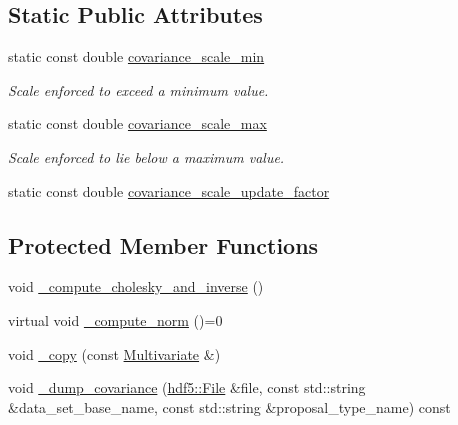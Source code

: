 \subsection*{Static Public Attributes}
\begin{DoxyCompactItemize}
\item 
static const double \hyperlink{classeos_1_1proposal__functions_1_1Multivariate_afd2de46a2288413f8e06c1f197b71ec2}{covariance\_\-scale\_\-min}
\begin{DoxyCompactList}\small\item\em Scale enforced to exceed a minimum value. \item\end{DoxyCompactList}\item 
static const double \hyperlink{classeos_1_1proposal__functions_1_1Multivariate_ab974d2da4b3dfcb7278418a25b07dd51}{covariance\_\-scale\_\-max}
\begin{DoxyCompactList}\small\item\em Scale enforced to lie below a maximum value. \item\end{DoxyCompactList}\item 
static const double \hyperlink{classeos_1_1proposal__functions_1_1Multivariate_a69c7f79624af473004a147598d9afaa1}{covariance\_\-scale\_\-update\_\-factor}
\end{DoxyCompactItemize}
\subsection*{Protected Member Functions}
\begin{DoxyCompactItemize}
\item 
void \hyperlink{classeos_1_1proposal__functions_1_1Multivariate_ad5a7764646a0c216344d96be9f01655b}{\_\-compute\_\-cholesky\_\-and\_\-inverse} ()
\item 
virtual void \hyperlink{classeos_1_1proposal__functions_1_1Multivariate_a284a17764a486687d3d1f2aee1a3bf3c}{\_\-compute\_\-norm} ()=0
\item 
void \hyperlink{classeos_1_1proposal__functions_1_1Multivariate_a33c4b4ed443dc77bb376636636f11b88}{\_\-copy} (const \hyperlink{classeos_1_1proposal__functions_1_1Multivariate}{Multivariate} \&)
\item 
void \hyperlink{classeos_1_1proposal__functions_1_1Multivariate_a4b45f19e0d4da4ed2c519d8a1d504fd2}{\_\-dump\_\-covariance} (\hyperlink{classeos_1_1hdf5_1_1File}{hdf5::File} \&file, const std::string \&data\_\-set\_\-base\_\-name, const std::string \&proposal\_\-type\_\-name) const 
\end{DoxyCompactItemize}
